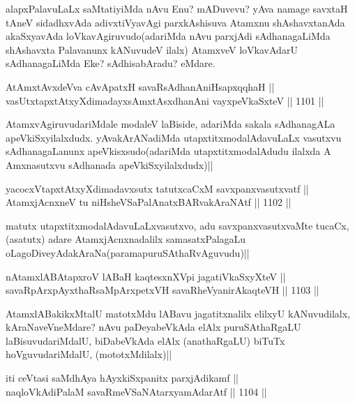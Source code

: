 \begin{artha}
alapxPalavuLaLx saMtatiyiMda nAvu Enu? mADuvevu? yAva namage savxtaH tAneV sidadhxvAda adivxtiVyavAgi parxkAshisuva Atamxnu shAshavxtanAda akaSxyavAda loVkavAgiruvudo(adariMda nAvu parxjAdi sAdhanagaLiMda shAshavxta Palavanunx kANuvudeV ilalx) AtamxveV loVkavAdarU sAdhanagaLiMda Eke? sAdhisabAradu? eMdare.
\end{artha}

\begin{shl}
AtAmxtAvxdeVva cAvApatxH savaRsAdhanAniHsapxqqhaH || \\
vasUtxtapxtAtxyXdimadayxsAmxtAsxdhanAni vayxpeVkaSxteV ||  1101 ||  
\end{shl}

\begin{artha}
AtamxvAgiruvudariMdale modaleV laBiside, adariMda sakala sAdhanagALa apeVkiSxyilalxdudx. yAvakArANadiMda utapxtitxmodalAdavuLaLx vasutxvu sAdhanagaLanunx apeVkisxsudo(adariMda utapxtitxmodalAdudu ilalxda A Amxnasutxvu sAdhanada apeVkiSxyilalxdudx)||
\end{artha}

\begin{shl}
yacocxVtapxtAtxyXdimadavxsutx tatutxcaCxM savxpanxvasutxvatf || \\
AtamxjAcnxneV tu niHsheVSaPalAnatxBARvakAraNAtf ||  1102 ||  
\end{shl}

\begin{artha}
matutx utapxtitxmodalAdavuLaLxvasutxvo, adu savxpanxvasutxvaMte tucaCx, (asatutx) adare AtamxjAcnxnadalilx samasatxPalagaLu oLagoDiveyAdakAraNa(paramapuruSAthaRvAguvudu)||
\end{artha}


\begin{shl}
nA\s \s tamxlABAtapxroV lABaH kaqtesxnXV\s pi jagatiVkaSxyXteV || \\
savaRpArxpAyxthaRsaMpArxpetxVH savaRheVyanirAkaqteVH ||  1103 ||  
\end{shl}

\begin{artha}
AtamxlABakikxMtalU matotxMdu lABavu jagatitxnalilx elilxyU kANuvudilalx, kAraNaveVneMdare? nAvu paDeyabeVkAda elAlx puruSAthaRgaLU laBisuvudariMdalU, biDabeVkAda elAlx (anathaRgaLU) biTuTx hoVguvudariMdalU, (mototxMdilalx)||
\end{artha}

\begin{shl}
iti ceVtasi saMdhAya hAyxkiSxpanitx parxjAdikamf || \\
naqloVkAdiPalaM savaRmeVSaNAtarxyamAdarAtf ||  1104 ||  
\end{shl}

